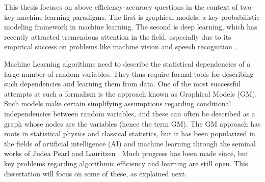 This thesis focuses on above efficiency-accuracy questions in the context of two key machine learning paradigms. The first is graphical models, a key probabilistic modeling framework in machine learning. The second is deep learning, which has recently attracted tremendous attention in the field, especially due to its empirical success on problems like machine vision \cite{krizhevsky2012imagenet} and speech recognition \cite{hinton2012deep}.


Machine Learning algorithms need to describe the statistical dependencies of a large number of random variables. They thus require formal tools for describing
such dependencies and learning them from data. One of the most successful attempts at such a formalism is the approach known as Graphical Models (GM). Such models make certain simplifying assumptions regarding conditional independencies between random variables, and these can often be described as a graph whose nodes are the variables (hence the term GM). The GM approach has roots in statistical physics and classical statistics, but it has been popularized in the fields of artificial intelligence (AI) and machine learning through the seminal works of Judea Pearl  \cite{pearl1986fusion} and Lauritzen  \cite{lauritzen1988local}.
Much progress has been made since, but key problems regarding algorithmic efficiency and learning are still open.
This dissertation will focus on some of these, as explained next.      



